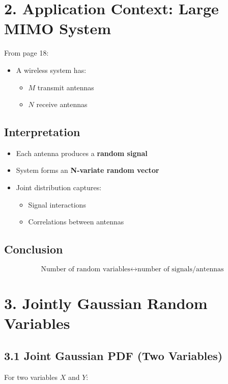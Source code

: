 \documentclass[11pt]{article}
\begin{document}
\section*{2. Application Context: Large MIMO System}

From page 18:

\begin{itemize}
\item A wireless system has:
\begin{itemize}
\item $M$ transmit antennas
\item $N$ receive antennas
\end{itemize}
\end{itemize}

\subsection*{Interpretation}

\begin{itemize}
\item Each antenna produces a \textbf{random signal}
\item System forms an \textbf{N-variate random vector}
\item Joint distribution captures:
\begin{itemize}
\item Signal interactions
\item Correlations between antennas
\end{itemize}
\end{itemize}

\subsection*{Conclusion}

\[
\text{Number of random variables} \leftrightarrow \text{number of signals/antennas}
\]

\section*{3. Jointly Gaussian Random Variables}

\subsection*{3.1 Joint Gaussian PDF (Two Variables)}

For two variables $X$ and $Y$:
\end{document}
